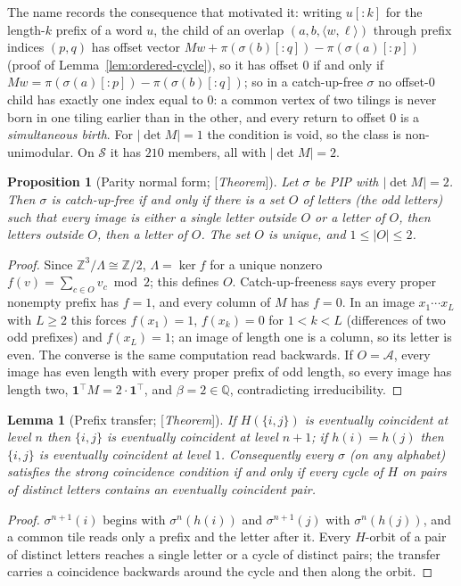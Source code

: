 \documentclass[11pt]{amsart}
\theoremstyle{plain}
\newtheorem{lemma}[theorem]{Lemma}
\newtheorem{proposition}[theorem]{Proposition}
\theoremstyle{definition}
\theoremstyle{remark}
\newcommand{\Z}{\mathbb{Z}}
\newcommand{\Q}{\mathbb{Q}}
\newcommand{\A}{\mathcal{A}}
\newcommand{\Status}[1]{\textup{[\textit{#1}]}}
\begin{document}
The name records the consequence that motivated it: writing $u[{:}k]$ for the length-$k$ prefix of a word $u$, the child of an overlap $(a,b,\langle w,\ell\rangle)$ through prefix indices $(p,q)$ has offset vector $Mw+\pi(\sigma(b)[{:}q])-\pi(\sigma(a)[{:}p])$ (proof of Lemma~\ref{lem:ordered-cycle}), so it has offset $0$ if and only if $Mw=\pi(\sigma(a)[{:}p])-\pi(\sigma(b)[{:}q])$; so in a catch-up-free $\sigma$ no offset-$0$ child has exactly one index equal to $0$: a common vertex of two tilings is never born in one tiling earlier than in the other, and every return to offset $0$ is a \emph{simultaneous birth}. For $|\det M|=1$ the condition is void, so the class is non-unimodular. On $\mathcal S$ it has $210$ members, all with $|\det M|=2$.

\begin{proposition}[Parity normal form; \Status{Theorem}]\label{prop:parity-form}
Let $\sigma$ be PIP with $|\det M|=2$. Then $\sigma$ is catch-up-free if and only if there is a set $O$ of letters (the \emph{odd} letters) such that every image is either a single letter outside $O$ or a letter of $O$, then letters outside $O$, then a letter of $O$. The set $O$ is unique, and $1\le|O|\le2$.
\end{proposition}
\begin{proof}
Since $\Z^3/\Lambda\cong\Z/2$, $\Lambda=\ker f$ for a unique nonzero $f(v)=\sum_{c\in O}v_c\bmod2$; this defines $O$. Catch-up-freeness says every proper nonempty prefix has $f=1$, and every column of $M$ has $f=0$. In an image $x_1\cdots x_L$ with $L\ge2$ this forces $f(x_1)=1$, $f(x_k)=0$ for $1<k<L$ (differences of two odd prefixes) and $f(x_L)=1$; an image of length one is a column, so its letter is even. The converse is the same computation read backwards. If $O=\A$, every image has even length with every proper prefix of odd length, so every image has length two, $\mathbf 1^{\top}M=2\cdot\mathbf 1^{\top}$, and $\beta=2\in\Q$, contradicting irreducibility.
\end{proof}

\begin{lemma}[Prefix transfer; \Status{Theorem}]\label{lem:prefix-transfer}
If $H(\{i,j\})$ is eventually coincident at level $n$ then $\{i,j\}$ is eventually coincident at level $n+1$; if $h(i)=h(j)$ then $\{i,j\}$ is eventually coincident at level $1$. Consequently every $\sigma$ (on any alphabet) satisfies the strong coincidence condition if and only if every cycle of $H$ on pairs of distinct letters contains an eventually coincident pair.
\end{lemma}
\begin{proof}
$\sigma^{n+1}(i)$ begins with $\sigma^n(h(i))$ and $\sigma^{n+1}(j)$ with $\sigma^n(h(j))$, and a common tile reads only a prefix and the letter after it. Every $H$-orbit of a pair of distinct letters reaches a single letter or a cycle of distinct pairs; the transfer carries a coincidence backwards around the cycle and then along the orbit.
\end{proof}
\end{document}

